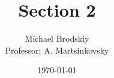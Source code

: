 


\title{Section 2}
\date{\today}
\author{Michael Brodskiy\\ \small Professor: A. Martsinkovsky}



\maketitle

\newpage

\tableofcontents

\listoffigures

\newpage

